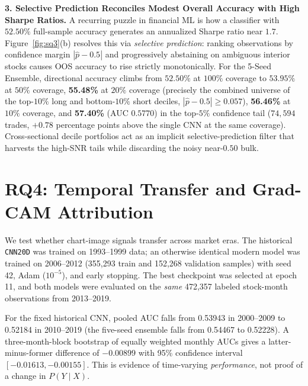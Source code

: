 \documentclass[10pt]{article}
\begin{document}
\textbf{3. Selective Prediction Reconciles Modest Overall Accuracy with High Sharpe Ratios.} A recurring puzzle in financial ML is how a classifier with $52.50\%$ full-sample accuracy generates an annualized Sharpe ratio near $1.7$. Figure~\ref{fig:sq3}(b) resolves this via \emph{selective prediction}: ranking observations by confidence margin $|\hat{p} - 0.5|$ and progressively abstaining on ambiguous interior stocks causes OOS accuracy to rise strictly monotonically. For the 5-Seed Ensemble, directional accuracy climbs from $52.50\%$ at $100\%$ coverage to $53.95\%$ at $50\%$ coverage, \textbf{55.48\%} at $20\%$ coverage (precisely the combined universe of the top-$10\%$ long and bottom-$10\%$ short deciles, $|\hat{p}-0.5| \ge 0.057$), \textbf{56.46\%} at $10\%$ coverage, and \textbf{57.40\%} (AUC $0.5770$) in the top-$5\%$ confidence tail ($74,594$ trades, $+0.78$ percentage points above the single CNN at the same coverage). Cross-sectional decile portfolios act as an implicit selective-prediction filter that harvests the high-SNR tails while discarding the noisy near-$0.50$ bulk.

\section{RQ4: Temporal Transfer and Grad-CAM Attribution}
\label{sec:sq4}
We test whether chart-image signals transfer across market eras. The historical
\texttt{CNN20D} was trained on 1993--1999 data; an otherwise identical modern
model was trained on 2006--2012 (355,293 train and 152,268 validation samples)
with seed 42, Adam ($10^{-5}$), and early stopping. The best checkpoint was
selected at epoch 11, and both models were evaluated on the \emph{same}
472,357 labeled stock-month observations from 2013--2019.

For the fixed historical CNN, pooled AUC falls from 0.53943 in 2000--2009
to 0.52184 in 2010--2019 (the five-seed ensemble falls from 0.54467 to
0.52228). A three-month-block bootstrap of equally weighted monthly AUCs
gives a latter-minus-former difference of $-0.00899$ with 95\% confidence
interval $[-0.01613,-0.00155]$. This is evidence of time-varying
\emph{performance}, not proof of a change in $P(Y\mid X)$.
\end{document}
